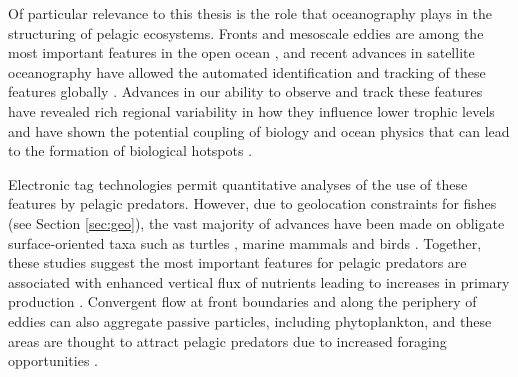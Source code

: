 Of particular relevance to this thesis is the role that oceanography plays in the structuring of pelagic ecosystems. Fronts and mesoscale eddies are among the most important features in the open ocean \citep{Chelton2011, McGillicuddy2016, Mahadevan2016}, and recent advances in satellite oceanography have allowed the automated identification and tracking of these features globally \citep{Chelton2011, Belkin2009}. Advances in our ability to observe and track these features have revealed rich regional variability in how they influence lower trophic levels \citep{McGillicuddy2016, Gaube2017DSR} and have shown the potential coupling of biology and ocean physics that can lead to the formation of biological hotspots \citep{Mann2006, Belkin2014}.


Electronic tag technologies permit quantitative analyses of the use of these features by pelagic predators. However, due to geolocation constraints for fishes (see Section \ref{sec:geo}), the vast majority of advances have been made on obligate surface-oriented taxa such as turtles \citep{Gaube2017, Polovina2006, Kobayashi2011}, marine mammals \citep{Johnston2007, Bailleul2010} and birds \citep{Thorne2013, TewKai2009}. Together, these studies suggest the most important features for pelagic predators are associated with enhanced vertical flux of nutrients leading to increases in primary production \citep{Franks1992}. Convergent flow at front boundaries and along the periphery of eddies can also aggregate passive particles, including phytoplankton, and these areas are thought to attract pelagic predators due to increased foraging opportunities \citep{Scales2014}.


